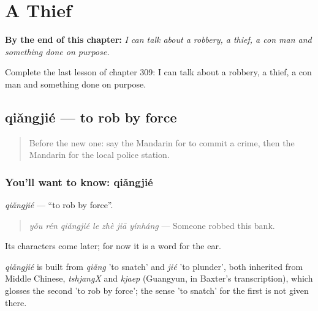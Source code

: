 
\chapter{A Thief}
\label{ch:zh-a-thief}

\begin{chapteropening}
\textbf{By the end of this chapter:} \emph{I can talk about a robbery, a thief, a con man and something done on purpose.}

Complete the last lesson of chapter 309: I can talk about a robbery, a thief, a con man and something done on purpose.
\end{chapteropening}

\section[qiǎngjié]{qiǎngjié — to rob by force}

\label{lesson:ZH-C309-qiangjie}



\begin{quote}
Before the new one: say the Mandarin for to commit a crime, then the Mandarin for the local police station.
\end{quote}

\subsection*{You'll want to know: qiǎngjié}
\emph{qiǎngjié} — \textquotedblleft{}to rob by force\textquotedblright{}.

\begin{quote}
\emph{yǒu rén qiǎngjié le zhè jiā yínháng} — Someone robbed this bank.
\end{quote}

Its characters come later; for now it is a word for the ear.

\begin{cousinweb}
\emph{qiǎngjié} is built from \emph{qiǎng} 'to snatch' and \emph{jié} 'to plunder', both inherited from Middle Chinese, \emph{tshjangX} and \emph{kjaep} (Guangyun, in Baxter's transcription), which glosses the second 'to rob by force'; the sense 'to snatch' for the first is not given there.
\end{cousinweb}

